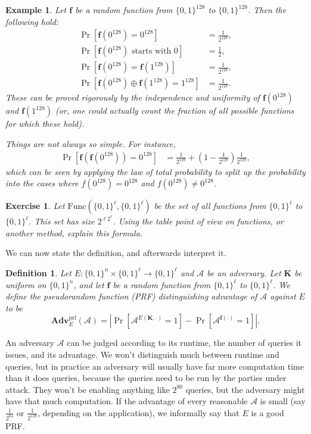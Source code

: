 \documentclass[11pt]{article}
\newtheorem{exercise}{Exercise}
\newtheorem{definition}{Definition}
\newtheorem{example}{Example}
\newcommand{\calA}{\mathcal{A}}
\newcommand{\Adv}{\mathbf{Adv}}
\newcommand{\AdvPRF}[2]{\Adv^{\mathrm{prf}}_{#1}({#2})}
\newcommand{\bits}{\{0,1\}}
\newcommand{\bK}{\mathbf{K}}
\newcommand{\bof}{\mathbf{f}}
\newcommand{\Func}{\mathrm{Func}}
\begin{document}
\begin{example}
Let $\bof$ be a random function from $\bits^{128}$ to $\bits^{128}$.
Then the following hold:
    \begin{align*}
        \Pr[\bof(0^{128}) = 0^{128}] &= \frac{1}{2^{128}}, \\
        \Pr[\bof(0^{128}) \text{ starts with $0$}] &= \frac{1}{2}, \\
        \Pr[\bof(0^{128}) = \bof(1^{128})] &= \frac{1}{2^{128}}, \\
        \Pr[\bof(0^{128}) \oplus \bof(1^{128}) = 1^{128}] &= \frac{1}{2^{128}}.
    \end{align*}
    These can be proved rigorously by the independence and uniformity of
    $\bof(0^{128})$ and $\bof(1^{128})$ (or, one could actually count
    the fraction of all possible functions for which these hold).
    
    Things are not always so simple. For instance,
    \begin{align*}
        \Pr[\bof(\bof(0^{128})) = 0^{128}] &= 
        \frac{1}{2^{128}} + (1-\frac{1}{2^{128}})\frac{1}{2^{128}},
    \end{align*}
    which can be seen by applying the law of total probability to split
    up the probability into the cases where $f(0^{128})=0^{128}$ and
     $f(0^{128})\neq0^{128}$.
\end{example}

\begin{exercise}
    Let $\Func(\bits^\ell,\bits^\ell)$ be the set of all functions from
$\bits^\ell$ to $\bits^\ell$. This set has size $2^{\ell2^\ell}$. Using the
table point of view on functions, or another method, explain this formula.
\end{exercise}

We can now state the definition, and afterwards interpret it.
\begin{definition}
    Let $E:\bits^n\times\bits^\ell\to\bits^\ell$ and $\calA$ be an adversary.
    Let $\bK$ be uniform on $\bits^n$, and let $\bof$ be a random function
    from $\bits^\ell$ to $\bits^\ell$.
    We define the \emph{pseudorandom function (PRF) distinguishing advantage
    of $\calA$ against $E$} to be
    \[
        \AdvPRF{E}{\calA} =
        \left|\Pr[\calA^{E(\bK,\cdot)}=1]-\Pr[\calA^{\bof(\cdot)}=1]\right|.
    \]
\end{definition}

An adversary $\calA$ can be judged according to its runtime, the number of
queries it issues, and its advantage. We won't distinguish much between runtime
and queries, but in practice an adversary will usually have far more
computation time than it does queries, because the queries need to be run by
the parties under attack. They won't be enabling anything like $2^{80}$ queries,
but the adversary might have that much computation.  If the advantage of every
reasonable $\calA$ is small (say $\frac{1}{2^{64}}$ or $\frac{1}{2^{128}}$,
depending on the application), we informally say that $E$ is a good PRF. 
\end{document}
